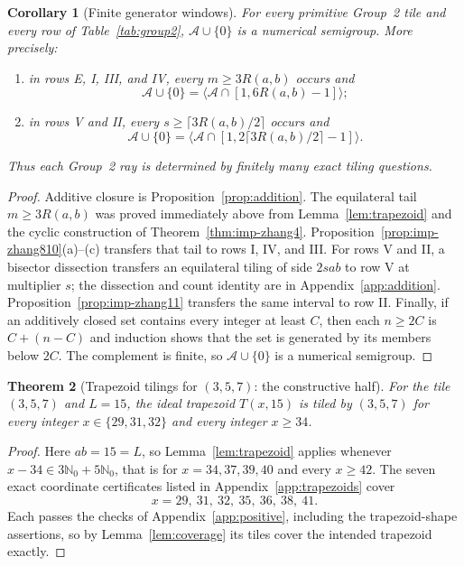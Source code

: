 \documentclass[11pt]{amsart}
\newtheorem{theorem}{Theorem}
\newtheorem{corollary}[theorem]{Corollary}
\theoremstyle{definition}
\theoremstyle{remark}
\newcommand{\Nzero}{\mathbb N_0}
\newcommand{\Aset}{\mathcal A}
\begin{document}
\pagebreak[3]
\begin{corollary}[Finite generator windows]\label{cor:windows}
For every primitive Group~2 tile and every row of
Table~\ref{tab:group2}, $\Aset\cup\{0\}$ is a numerical semigroup.
More precisely:
\begin{enumerate}[label=\textup{(\roman*)}]
\item in rows E, I, III, and IV, every $m\ge3R(a,b)$ occurs and
\[
 \Aset\cup\{0\}
 =\big\langle\Aset\cap[1,6R(a,b)-1]\big\rangle;
\]
\item in rows V and II, every $s\ge\lceil3R(a,b)/2\rceil$ occurs and
\[
 \Aset\cup\{0\}
 =\big\langle\Aset\cap
 [1,2\lceil3R(a,b)/2\rceil-1]\big\rangle.
\]
\end{enumerate}
Thus each Group~2 ray is determined by finitely many exact tiling questions.
\end{corollary}

\begin{proof}
Additive closure is Proposition~\ref{prop:addition}.  The equilateral tail
$m\ge3R(a,b)$ was proved immediately above from
Lemma~\ref{lem:trapezoid} and the cyclic construction of
Theorem~\ref{thm:imp-zhang4}.
Proposition~\ref{prop:imp-zhang810}(a)--(c) transfers that tail to rows I,
IV, and III.  For rows V and II,
a bisector dissection transfers an equilateral tiling of side $2sab$ to row V
at multiplier $s$; the dissection and count identity are in
Appendix~\ref{app:addition}.  Proposition~\ref{prop:imp-zhang11} transfers
the same interval to row II.
Finally, if an additively closed set contains every integer at least $C$,
then each $n\ge2C$ is $C+(n-C)$ and induction shows that the set is generated
by its members below $2C$.  The complement is finite, so
$\Aset\cup\{0\}$ is a numerical semigroup.
\end{proof}

\begin{theorem}[Trapezoid tilings for $(3,5,7)$: the constructive half]
\label{thm:trapezoid-plus}
For the tile $(3,5,7)$ and $L=15$, the ideal trapezoid $T(x,15)$ is tiled by
$(3,5,7)$ for every integer $x\in\{29,31,32\}$ and every integer $x\ge34$.
\end{theorem}

\begin{proof}
Here $ab=15=L$, so Lemma~\ref{lem:trapezoid} applies whenever
$x-34\in3\Nzero+5\Nzero$, that is for $x=34,37,39,40$ and every $x\ge42$.
The seven exact coordinate certificates listed in
Appendix~\ref{app:trapezoids} cover
\[
  x=29,\ 31,\ 32,\ 35,\ 36,\ 38,\ 41 .
\]
Each passes the checks of Appendix~\ref{app:positive}, including the
trapezoid-shape assertions, so by Lemma~\ref{lem:coverage} its tiles cover
the intended trapezoid exactly.
\end{proof}
\end{document}
